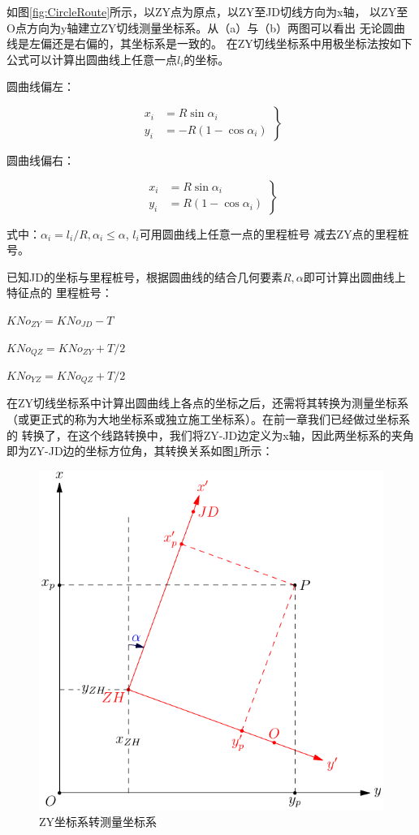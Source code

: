  如图\ref{fig:CircleRoute}所示，以ZY点为原点，以ZY至JD切线方向为x轴，
 以ZY至O点方向为y轴建立ZY切线测量坐标系。从（a）与（b）两图可以看出
无论圆曲线是左偏还是右偏的，其坐标系是一致的。
 在ZY切线坐标系中用极坐标法按如下公式可以计算出圆曲线上任意一点$l_i$的坐标。

圆曲线偏左：

\[
\left . \begin{aligned}
x_{i} &= R \sin \alpha_i   \\
y_{i} &= -R(1- \cos \alpha_i)
\end{aligned} \right \}
\]

圆曲线偏右：

\[
\left . \begin{aligned}
x_{i} &= R \sin \alpha_i   \\
y_{i} &= R(1- \cos \alpha_i)
\end{aligned} \right \}
\]

式中：$\alpha_i = l_i / R,  \alpha_i \le \alpha $, $l_i$可用圆曲线上任意一点的里程桩号
减去ZY点的里程桩号。

已知JD的坐标与里程桩号，根据圆曲线的结合几何要素$R, \alpha$即可计算出圆曲线上特征点的
里程桩号：

$KNo_{ZY} = KNo_{JD} - T$

$KNo_{QZ} = KNo_{ZY} + T/2$

$KNo_{YZ} = KNo_{QZ} + T/2$

在ZY切线坐标系中计算出圆曲线上各点的坐标之后，还需将其转换为测量坐标系
（或更正式的称为大地坐标系或独立施工坐标系）。在前一章我们已经做过坐标系的
转换了，在这个线路转换中，我们将ZY-JD边定义为x轴，因此两坐标系的夹角
即为ZY-JD边的坐标方位角，其转换关系如图\ref{fig:xytoxyroute}所示：

\begin{figure}[htbp]
    \centering
    \includegraphics[scale=0.8]{route/xytoxyroute.pdf}
    \caption{ZY坐标系转测量坐标系}
    \label{fig:xytoxyroute}
\end{figure}

